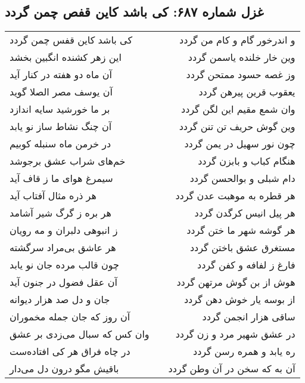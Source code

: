 \begin{center}
\section*{غزل شماره ۶۸۷: کی باشد کاین قفص چمن گردد}
\label{sec:0687}
\begin{longtable}{l p{0.5cm} r}
کی باشد کاین قفس چمن گردد
&&
و اندرخور گام و کام من گردد
\\
این زهر کشنده انگبین بخشد
&&
وین خار خلنده یاسمن گردد
\\
آن ماه دو هفته در کنار آید
&&
وز غصه حسود ممتحن گردد
\\
آن یوسف مصر الصلا گوید
&&
یعقوب قرین پیرهن گردد
\\
بر ما خورشید سایه اندازد
&&
وان شمع مقیم این لگن گردد
\\
آن چنگ نشاط ساز نو یابد
&&
وین گوش حریف تن تنن گردد
\\
در خرمن ماه سنبله کوبیم
&&
چون نور سهیل در یمن گردد
\\
خم‌های شراب عشق برجوشد
&&
هنگام کباب و بابزن گردد
\\
سیمرغ هوای ما ز قاف آید
&&
دام شبلی و بوالحسن گردد
\\
هر ذره مثال آفتاب آید
&&
هر قطره به موهبت عدن گردد
\\
هر بره ز گرگ شیر آشامد
&&
هر پیل انیس کرگدن گردد
\\
ز انبوهی دلبران و مه رویان
&&
هر گوشه شهر ما ختن گردد
\\
هر عاشق بی‌مراد سرگشته
&&
مستغرق عشق باختن گردد
\\
چون قالب مرده جان نو یابد
&&
فارغ ز لفافه و کفن گردد
\\
آن عقل فضول در جنون آید
&&
هوش از بن گوش مرتهن گردد
\\
جان و دل صد هزار دیوانه
&&
از بوسه یار خوش دهن گردد
\\
آن روز که جان جمله مخموران
&&
ساقی هزار انجمن گردد
\\
وان کس که سبال می‌زدی بر عشق
&&
در عشق شهیر مرد و زن گردد
\\
در چاه فراق هر کی افتاده‌ست
&&
ره یابد و همره رسن گردد
\\
باقیش مگو درون دل می‌دار
&&
آن به که سخن در آن وطن گردد
\\
\end{longtable}
\end{center}
